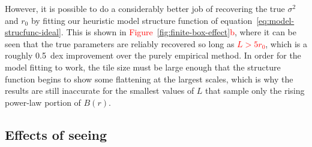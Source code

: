 \documentclass[fleqn,usenatbib, useAMS, a4paper]{mnras}
\begin{document}
However, it is possible to do a considerably better job
of recovering the true \(\sigma^2\) and \(r_0\) by fitting our
heuristic model structure function of equation~\eqref{eq:model-strucfunc-ideal}.
This is shown in \textcolor{red}{Figure~\ref{fig:finite-box-effect}b}, where it can be seen
that the true parameters are reliably recovered so long as \textcolor{red}{\(L > 5 r_0\)},
which is a roughly \SI{0.5}{dex} improvement over the purely empirical method.
In order for the model fitting to work, the tile size must be large enough
that the structure function begins to show some flattening at the largest scales,
which is why the results are still inaccurate for the smallest values of \(L\)
that sample only the rising power-law portion of \(B(r)\). 

\subsection{\color{red}Effects of seeing}
\label{sec:effects-seeing-struc}
\end{document}
